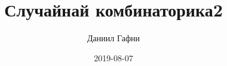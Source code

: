 \documentclass[a4paper,11pt]{article}%
\title{Случайнай комбинаторика2}%
\author{Даниил Гафни}%
\date{2019{-}08{-}07}%
\theoremstyle{definition}%
\begin{document}
%
\normalsize%
\maketitle%
\end{document}
